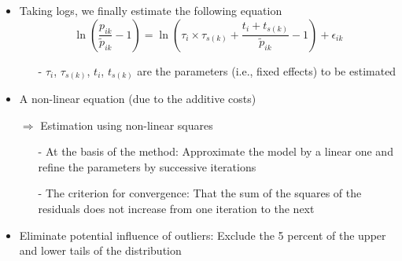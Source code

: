 \documentclass[10 pt,Helvetica, french]{beamer}
\begin{document}
\begin{frame}
\begin{itemize}
\item Taking logs, we finally estimate the following equation 
\footnotesize
\begin{equation}
\ln\left(\frac{p_{ik}}{\widetilde{p}_{ik}}-1 \right)= \ln \left(\tau_{i} \times \tau_{s(k)}+\frac{t_{i} + t_{s(k)}}{\widetilde{p}_{ik}}-1 \right) + \epsilon_{ik} \label{eq:est_equation}
\end{equation}
\normalsize
\begin{itemize}
\item[-] $\tau_i$, $\tau_{s(k)}$, $t_i$, $t_{s(k)}$ are the parameters (i.e., fixed effects) to be estimated \vspace{0.1cm}
\end{itemize}
\item A non-linear equation (due to the additive costs)  \vspace{0.1cm}
\item[$\Rightarrow$] Estimation using non-linear squares \vspace{0.1cm}
\begin{itemize}
\item[-] At the basis of the method: Approximate the model by a linear one and refine the parameters by successive iterations \vspace{0.1cm}
\item[-] The criterion for convergence: That the sum of the squares of the residuals does not increase from one iteration to the next \vspace{0.1cm}
\end{itemize}
\item Eliminate potential influence of outliers: Exclude the 5 percent of the upper and lower tails of the distribution
\end{itemize}
\end{frame}
\end{document}
